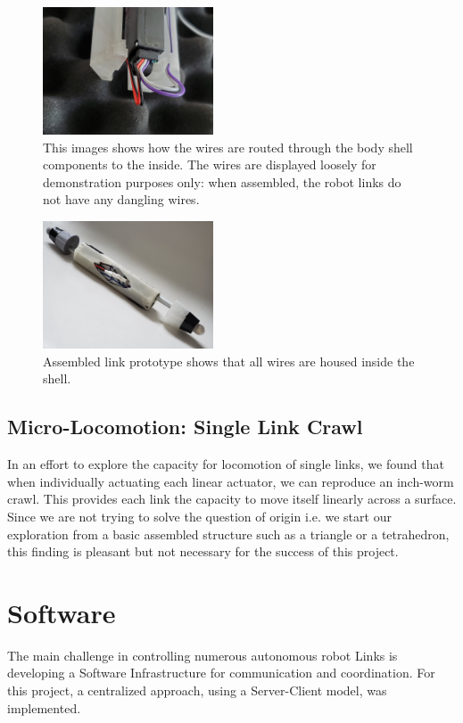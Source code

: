 \documentclass[letterpaper, 10 pt, conference]{ieeeconf}  %
\begin{document}
\begin{figure}
\centering
\includegraphics[width=0.45\textwidth]{media/wiringChannels.jpg}
   \caption{\label{fig_wireChannel} This images shows how the wires are routed through the body shell components to the inside. The wires are displayed loosely for demonstration purposes only: when assembled, the robot links do not have any dangling wires.}
\end{figure}

\begin{figure}
\centering
\includegraphics[width=0.45\textwidth]{media/linkprototype.jpg}
   \caption{\label{fig_linkprototype} Assembled link prototype shows that all wires are housed inside the shell.}
\end{figure}

\subsection{Micro-Locomotion: Single Link Crawl}
In an effort to explore the capacity for locomotion of single links, we found that when individually actuating each linear actuator, we can reproduce an inch-worm crawl. This provides each link the capacity to move itself linearly across a surface. Since we are not trying to solve the question of origin i.e. we start our exploration from a basic assembled structure such as a triangle or a tetrahedron, this finding is pleasant but not necessary for the success of this project.

\section{Software}
The main challenge in controlling numerous autonomous robot Links is developing a Software Infrastructure for communication and coordination. For this project, a centralized approach, using a Server-Client model, was implemented.
\end{document}
